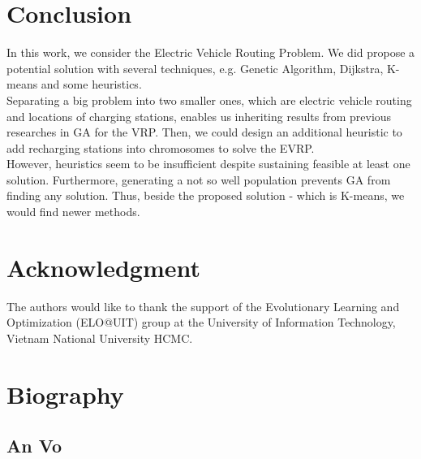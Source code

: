 \documentclass[conference,compsoc]{IEEEtran}
\begin{document}
\section{Conclusion}
In this work, we consider the Electric Vehicle Routing Problem. We did propose a potential solution with several techniques, e.g. Genetic Algorithm, Dijkstra, K-means and some heuristics.\\

Separating a big problem into two smaller ones, which are electric vehicle routing and locations of charging stations, enables us inheriting results from previous researches in GA for the VRP. Then, we could design an additional heuristic to add recharging stations into chromosomes to solve the EVRP.\\

However, heuristics seem to be insufficient despite sustaining feasible at least one solution. Furthermore, generating a not so well population prevents GA from finding any solution. Thus, beside the proposed solution - which is K-means, we would find newer methods.

\section*{Acknowledgment}
The authors would like to thank the support of the Evolutionary Learning and Optimization (ELO@UIT) group at the University of Information Technology, Vietnam National University HCMC.
\newpage
\section*{Biography}
\subsection*{An Vo}
\end{document}
